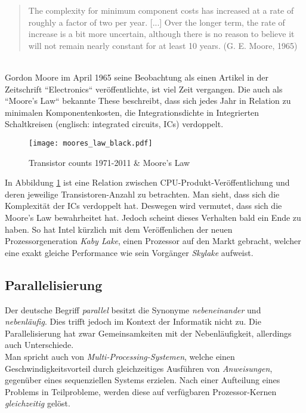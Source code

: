 \documentclass[10pt,journal,compsoc]{IEEEtran}
\begin{document}
  \begin{quotation}
The complexity for minimum component costs has increased at a rate of roughly a factor of two per year. [...] Over the longer term, the rate of increase is a bit more uncertain, although there is no reason to believe it will not remain nearly constant for at least 10 years. (G. E. Moore, 1965)
  \end{quotation}
  ~\\
 Gordon Moore im April 1965 seine Beobachtung als einen Artikel in der Zeitschrift ``Electronics`` veröffentlichte, ist viel Zeit vergangen.
Die auch als ``Moore's Law`` bekannte These beschreibt, dass sich jedes Jahr in Relation zu minimalen Komponentenkosten, die Integrationsdichte in Integrierten Schaltkreisen (englisch: integrated circuits, ICs) verdoppelt. 
\cite{mooreElectronics}
  
\begin{figure}
\centering
\texttt{[image: moores\_law\_black.pdf]}
\caption{Transistor counts 1971-2011 \& Moore's Law}
\label{fig_moores}
\end{figure}

In Abbildung \ref{fig_moores} ist eine Relation zwischen CPU-Produkt-Veröffentlichung und deren jeweilige Transistoren-Anzahl zu betrachten. Man sieht, dass sich die Komplexität der ICs verdoppelt hat. Deswegen wird vermutet, dass sich die Moore's Law bewahrheitet hat. Jedoch scheint dieses Verhalten bald ein Ende zu haben.
So hat Intel kürzlich mit dem Veröffenlichen der neuen Prozessorgeneration \textit{Kaby Lake}, einen Prozessor auf den Markt gebracht, welcher eine exakt gleiche Performance wie sein Vorgänger \textit{Skylake} aufweist.



\subsection{Parallelisierung}
Der deutsche Begriff \textit{parallel} besitzt die Synonyme \textit{nebeneinander} und \textit{nebenläufig}. Dies trifft jedoch im Kontext der Informatik nicht zu. Die Parallelisierung hat zwar Gemeinsamkeiten mit der Nebenläufigkeit, allerdings auch Unterschiede.
\\Man spricht auch von \textit{Multi-Processing-Systemen}, welche einen Geschwindigkeitsvorteil durch gleichzeitiges Ausführen von \textit{Anweisungen}, gegenüber eines sequenziellen Systems erzielen. \cite{sevenCon} 
Nach einer Aufteilung eines Problems in Teilprobleme, werden diese auf verfügbaren Prozessor-Kernen \textit{gleichzeitig} gelöst.
\end{document}
